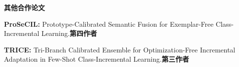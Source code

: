 \documentclass[11pt,a4paper]{article}
\begin{document}
\vspace{2pt}
\textbf{其他合作论文}\par\vspace{2pt}
{\fontsize{9.4}{11.5}\selectfont
\textbf{ProSeCIL:} Prototype-Calibrated Semantic Fusion for Exemplar-Free Class-Incremental Learning.\hfill \mbox{\textbf{第四作者}}\par\vspace{2pt}
\textbf{TRICE:} Tri-Branch Calibrated Ensemble for Optimization-Free Incremental Adaptation in Few-Shot Class-Incremental Learning.\hfill \mbox{\textbf{第三作者}}\par
}
\end{document}
